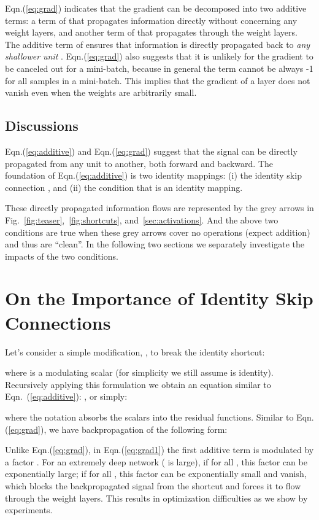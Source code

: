 \documentclass[runningheads]{llncs}
\begin{document}
Eqn.(\ref{eq:grad}) indicates that the gradient  can be decomposed into two additive terms: a term of  that propagates information directly without concerning any weight layers, and another term of {\fontsize{8pt}{1em}\selectfont } that propagates through the weight layers. The additive term of  ensures that information is directly propagated back to \emph{any shallower unit} .
Eqn.(\ref{eq:grad}) also suggests that it is unlikely for the gradient  to be canceled out for a mini-batch, because in general the term {\fontsize{8pt}{1em}\selectfont } cannot be always -1 for all samples in a mini-batch. This implies that the gradient of a layer does not vanish even when the weights are arbitrarily small.

\subsection*{Discussions}

Eqn.(\ref{eq:additive}) and Eqn.(\ref{eq:grad}) suggest that the signal can be directly propagated from any unit to another, both forward and backward.
The foundation of Eqn.(\ref{eq:additive}) is two identity mappings: (i) the identity skip connection , and (ii) the condition that  is an identity mapping.

These directly propagated information flows are represented by the grey arrows in Fig.~\ref{fig:teaser},~\ref{fig:shortcuts}, and~\ref{sec:activations}. And the above two conditions are true when these grey arrows cover no operations (expect addition) and thus are ``clean''.
In the following two sections we separately investigate the impacts of the two conditions.


\section{On the Importance of Identity Skip Connections}
\label{sec:identityskip}

Let's consider a simple modification, , to break the identity shortcut:

where  is a modulating scalar (for simplicity we still assume  is identity). Recursively applying this formulation we obtain an equation similar to Eqn.~(\ref{eq:additive}): , or simply:

where the notation  absorbs the scalars into the residual functions.
Similar to Eqn.(\ref{eq:grad}), we have backpropagation of the following form:

Unlike Eqn.(\ref{eq:grad}), in Eqn.(\ref{eq:grad1}) the first additive term is modulated by a factor . For an extremely deep network ( is large), if  for all , this factor can be exponentially large; if  for all , this factor can be exponentially small and vanish, which blocks the backpropagated signal from the shortcut and forces it to flow through the weight layers. This results in optimization difficulties as we show by experiments.
\end{document}
